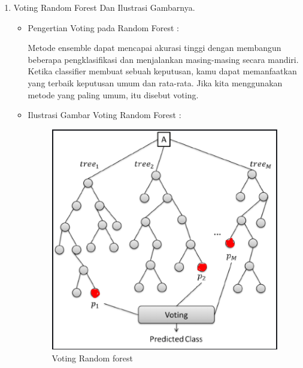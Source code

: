 \begin{enumerate}
\par
\par
\item Voting Random Forest Dan Ilustrasi Gambarnya.
\par
\begin{itemize}
\item Pengertian Voting pada Random Forest	:
\par Metode ensemble dapat mencapai akurasi tinggi dengan membangun beberapa pengklasifikasi dan menjalankan
masing-masing secara mandiri. Ketika classifier membuat sebuah keputusan, kamu dapat memanfaatkan yang terbaik
keputusan umum dan rata-rata. Jika kita menggunakan metode yang paling umum, itu disebut voting.
\item Ilustrasi Gambar Voting Random Forest :
\begin{figure}[!hbtp]
\centering
\includegraphics[scale=1]{figures/AIP/asm2.PNG}
\caption{Voting Random forest}
\label{contoh}
\end{figure}
\end{itemize}
\end{enumerate}

